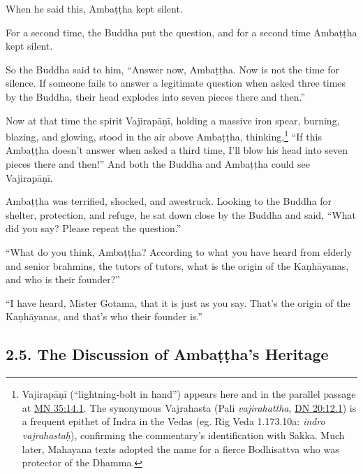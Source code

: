 \documentclass[12pt,openany]{book}%
\begin{document}
When he said this, \textsanskrit{Ambaṭṭha} kept silent. 

For a second time, the Buddha put the question, and for a second time \textsanskrit{Ambaṭṭha} kept silent. 

So the Buddha said to him, “Answer now, \textsanskrit{Ambaṭṭha}. Now is not the time for silence. If someone fails to answer a legitimate question when asked three times by the Buddha, their head explodes into seven pieces there and then.” 

Now at that time the spirit \textsanskrit{Vajirapāṇī}, holding a massive iron spear, burning, blazing, and glowing, stood in the air above \textsanskrit{Ambaṭṭha}, thinking,\footnote{\textsanskrit{Vajirapāṇī} (“lightning-bolt in hand”) appears here and in the parallel passage at \href{https://suttacentral.net/mn35/en/sujato\#14.1}{MN 35:14.1}. The synonymous Vajrahasta (Pali \textit{vajirahattha}, \href{https://suttacentral.net/dn20/en/sujato\#12.1}{DN 20:12.1}) is a frequent epithet of Indra in the Vedas (eg. Rig Veda 1.173.10a: \textit{indro vajrahastaḥ}), confirming the commentary’s identification with Sakka. Much later, Mahayana texts adopted the name for a fierce Bodhisattva who was protector of the Dhamma. } “If this \textsanskrit{Ambaṭṭha} doesn’t answer when asked a third time, I’ll blow his head into seven pieces there and then!” And both the Buddha and \textsanskrit{Ambaṭṭha} could see \textsanskrit{Vajirapāṇī}. 

\textsanskrit{Ambaṭṭha} was terrified, shocked, and awestruck. Looking to the Buddha for shelter, protection, and refuge, he sat down close by the Buddha and said, “What did you say? Please repeat the question.” 

“What do you think, \textsanskrit{Ambaṭṭha}? According to what you have heard from elderly and senior brahmins, the tutors of tutors, what is the origin of the \textsanskrit{Kaṇhāyanas}, and who is their founder?” 

“I have heard, Mister Gotama, that it is just as you say. That’s the origin of the \textsanskrit{Kaṇhāyanas}, and that’s who their founder is.” 

\subsection*{2.5. The Discussion of \textsanskrit{Ambaṭṭha}’s Heritage }
\end{document}
